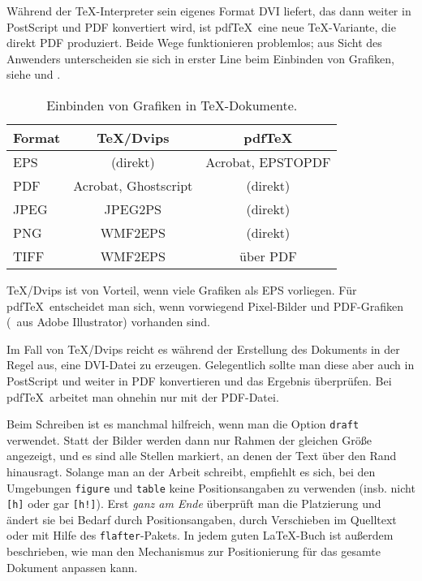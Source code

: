 Während der \TeX-Interpreter sein eigenes Format DVI liefert, das dann weiter in
PostScript und PDF konvertiert wird, ist pdf\TeX\ eine neue \TeX-Variante, die
direkt PDF produziert. Beide Wege funktionieren problemlos; aus Sicht des
Anwenders unterscheiden sie sich in erster Line beim Einbinden von Grafiken,
siehe  und .
\begin{table}[tbp]
  \caption{Einbinden von Grafiken in \TeX-Dokumente.}
  \label{tab:Einbinden}\centering
  \begin{tabular}{lcc}\hline
    Format & \TeX/Dvips           & pdf\TeX  \\ \hline
    EPS    & (direkt)             & Acrobat, EPSTOPDF \\
    PDF    & Acrobat, Ghostscript & (direkt) \\
    JPEG   & JPEG2PS              & (direkt) \\
    PNG    & WMF2EPS              & (direkt) \\
    TIFF   & WMF2EPS              & über PDF \\ \hline
  \end{tabular}
\end{table}
\TeX/Dvips ist von Vorteil, wenn viele Grafiken als EPS vorliegen. Für pdf\TeX\
entscheidet man sich, wenn vorwiegend Pixel-Bilder und PDF-Grafiken (\zB\ aus
Adobe Illustrator) vorhanden sind.

Im Fall von \TeX/Dvips reicht es während der Erstellung des Dokuments in der
Regel aus, eine DVI-Datei zu erzeugen. Gelegentlich sollte man diese aber auch
in PostScript und weiter in PDF konvertieren und das Ergebnis überprüfen. Bei
pdf\TeX\ arbeitet man ohnehin nur mit der PDF-Datei.

Beim Schreiben ist es manchmal hilfreich, wenn man die Option \verb|draft| verwendet. Statt der Bilder werden dann nur Rahmen
der gleichen Größe angezeigt, und es sind alle Stellen markiert, an denen der
Text über den Rand hinausragt. Solange man an der Arbeit schreibt, empfiehlt es
sich, bei den Umgebungen \verb|figure| und \verb|table| keine Positionsangaben
zu verwenden (insb. nicht \verb|[h]| oder gar \verb|[h!]|). Erst \emph{ganz am
Ende} überprüft man die Platzierung und ändert sie bei Bedarf durch
Positionsangaben, durch Verschieben im Quelltext oder mit Hilfe des
\verb|flafter|-Pakets. In jedem guten \LaTeX-Buch ist außerdem beschrieben, wie
man den Mechanismus zur Positionierung für das gesamte Dokument anpassen kann.

